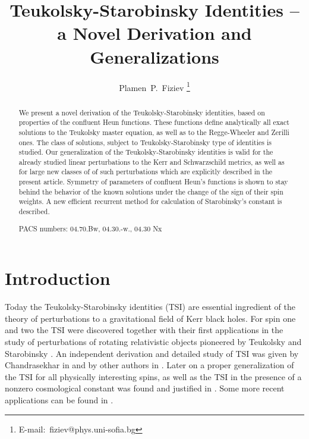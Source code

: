 \documentclass[prd,aps,twocolumn,leterpaper,preprintnumbers]{revtex4}
\numberwithin{equation}{section}
\begin{document}

\title{Teukolsky-Starobinsky Identities -- a Novel Derivation and Generalizations}

\author{Plamen~P.~Fiziev
\footnote{E-mail:\,\,\,fiziev@phys.uni-sofia.bg}}



\begin{abstract}
We present a novel derivation of the Teukolsky-Starobinsky identities,
based on properties of the confluent Heun functions. These functions define analytically
all exact solutions to the Teukolsky master equation, as well as to the Regge-Wheeler and Zerilli ones.
The class of solutions, subject to Teukolsky-Starobinsky type of identities is studied.
Our generalization of the Teukolsky-Starobinsky identities is valid for the already studied
linear perturbations to the Kerr and Schwarzschild metrics, as well as for
large new classes of of such perturbations which are explicitly described in the present article.
Symmetry of parameters of confluent Heun's functions is shown to stay behind the
behavior of the known solutions under the change of the sign of their spin weights.
A new efficient recurrent method for calculation of  Starobinsky's constant is
described.

PACS numbers:  04.70.Bw, 04.30.-w., 04.30 Nx
\end{abstract}
\sloppy
\maketitle
\section{Introduction}

Today the Teukolsky-Starobinsky identities (TSI)
are essential ingredient of the theory of
perturbations to a gravitational field of Kerr black holes.
For spin one and two the TSI were discovered together with their first applications
in the study of perturbations of rotating relativistic objects
pioneered by Teukolsky \cite{Teukolsky} and Starobinsky \cite{Starobinsky}.
An independent derivation and detailed study of TSI was given by Chandrasekhar in
\cite{Chandra,ChandraMT} and by other authors in \cite{other}.
Later on a proper generalization of the TSI for all physically interesting spins,
as well as the TSI in the presence of a nonzero cosmological constant
was found and justified in \cite{TSI}.
Some more recent applications can be found in \cite{TSIapplications}.
\end{document}
